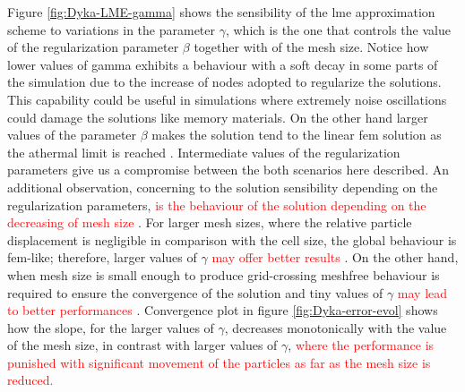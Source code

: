 \documentclass[preprint,12pt,a4paper]{elsarticle}
\newcommand{\PNA}[1]{
  \textcolor{red}{{#1}}
}
\begin{document}
Figure \eqref{fig:Dyka-LME-gamma} shows the sensibility of the \acrshort{lme}
approximation scheme to variations in the parameter
$\gamma$, which is the one that controls the value of the regularization parameter
$\beta$ together with of the mesh size. Notice how lower values of
gamma exhibits a behaviour with a soft decay in some parts of the
simulation due to the increase of nodes adopted to regularize the
solutions. This capability could be useful in simulations where
extremely noise oscillations could damage the solutions like memory
materials. On the other hand larger values of the parameter $\beta$
makes the solution tend to the linear \acrshort{fem} solution as the athermal limit is reached \cite{Arroyo2006}. Intermediate values of the
regularization parameters give us a compromise between the both
scenarios here described. An additional observation, concerning to the
solution sensibility depending on the regularization parameters, \PNA{is the behaviour of the solution depending on the decreasing of mesh
size}. For larger mesh sizes, where the relative particle displacement
is negligible in comparison with the cell size, the global behaviour
is \acrshort{fem}-like; therefore, larger values of $\gamma$ \PNA{may offer better results}. On the other hand, when mesh size is small enough to produce
grid-crossing meshfree behaviour is required to ensure the
convergence of the solution and tiny values of $\gamma$\PNA{may lead to better
performances}. Convergence plot in figure \eqref{fig:Dyka-error-evol}
shows how the slope, for the larger values of $\gamma$, decreases
monotonically with the value of the mesh size, in contrast with larger
values of $\gamma$,\PNA{where the performance is punished with significant
movement of the particles as far as the mesh size is reduced.} 
\end{document}
